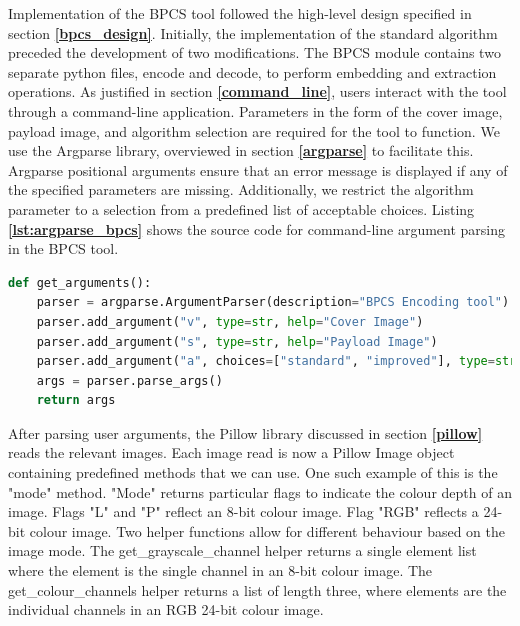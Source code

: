 \documentclass{l4proj}
\begin{document}
Implementation of the BPCS tool followed the high-level design specified in section \textbf{\ref{bpcs_design}}. Initially, the implementation of the standard algorithm preceded the development of two modifications. The BPCS module contains two separate python files, encode and decode, to perform embedding and extraction operations.  As justified in section \textbf{\ref{command_line}}, users interact with the tool through a command-line application. Parameters in the form of the cover image, payload image, and algorithm selection are required for the tool to function. We use the Argparse library, overviewed in section \textbf{\ref{argparse}} to facilitate this. Argparse positional arguments ensure that an error message is displayed if any of the specified parameters are missing. Additionally, we restrict the algorithm parameter to a selection from a predefined list of acceptable choices. Listing \textbf{\ref{lst:argparse_bpcs}} shows the source code for command-line argument parsing in the BPCS tool. 

\begin{lstlisting}[language=python, float, caption={Command-line argument parsing using the Argparse library. Cover, payload and algorithm selection specified as positional arguments. Algorithm selection restricted to a choice from a set of predefined options.}, label=lst:argparse_bpcs]
    def get_arguments():
    parser = argparse.ArgumentParser(description="BPCS Encoding tool")
    parser.add_argument("v", type=str, help="Cover Image")
    parser.add_argument("s", type=str, help="Payload Image")
    parser.add_argument("a", choices=["standard", "improved"], type=str, help="Algorithm. Standard or Improved")
    args = parser.parse_args()
    return args
\end{lstlisting}

After parsing user arguments, the Pillow library discussed in section \textbf{\ref{pillow}} reads the relevant images. Each image read is now a Pillow Image object containing predefined methods that we can use. One such example of this is the "mode" method. "Mode" returns particular flags to indicate the colour depth of an image. Flags "L" and "P" reflect an 8-bit colour image. Flag "RGB" reflects a 24-bit colour image. Two helper functions allow for different behaviour based on the image mode. The get\_grayscale\_channel helper returns a single element list where the element is the single channel in an 8-bit colour image. The get\_colour\_channels helper returns a list of length three, where elements are the individual channels in an RGB 24-bit colour image.
\end{document}
